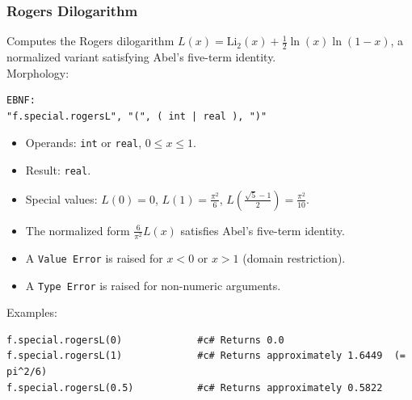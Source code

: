 \subsubsection{Rogers Dilogarithm}
Computes the Rogers dilogarithm $L(x) = \text{Li}_2(x) + \frac{1}{2}\ln(x)\ln(1-x)$, a normalized variant satisfying Abel's five-term identity. \\
Morphology:
\begin{verbatim}
EBNF:
"f.special.rogersL", "(", ( int | real ), ")"
\end{verbatim}
\begin{itemize}
\item Operands: \texttt{int} or \texttt{real}, $0 \leq x \leq 1$.
\item Result: \texttt{real}.
\item Special values: $L(0) = 0$, $L(1) = \frac{\pi^2}{6}$, $L\!\left(\frac{\sqrt{5}-1}{2}\right) = \frac{\pi^2}{10}$.
\item The normalized form $\frac{6}{\pi^2}L(x)$ satisfies Abel's five-term identity.
\item A \texttt{Value Error} is raised for $x < 0$ or $x > 1$ (domain restriction).
\item A \texttt{Type Error} is raised for non-numeric arguments.
\end{itemize}
Examples:
\begin{verbatim}
f.special.rogersL(0)             #c# Returns 0.0
f.special.rogersL(1)             #c# Returns approximately 1.6449  (= pi^2/6)
f.special.rogersL(0.5)           #c# Returns approximately 0.5822
\end{verbatim}

